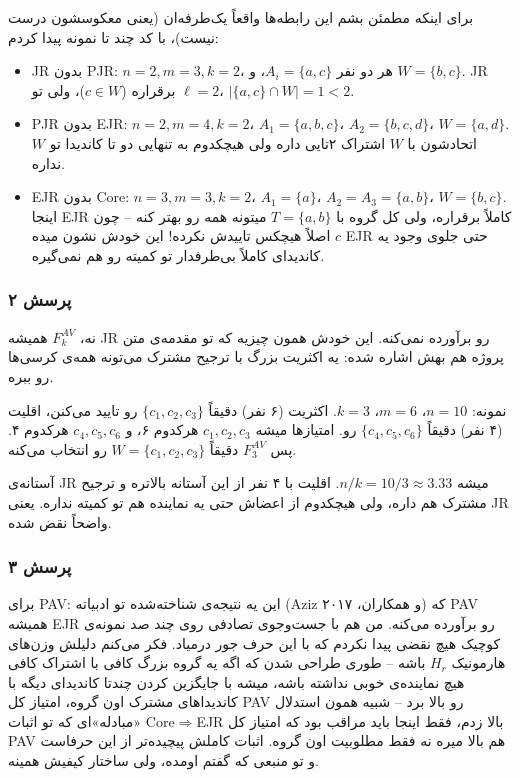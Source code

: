\documentclass[12pt, a4paper]{article}
\begin{document}
برای اینکه مطمئن بشم این رابطه‌ها واقعاً یک‌طرفه‌ان (یعنی معکوسشون درست نیست)، با کد چند تا نمونه پیدا کردم:
\begin{itemize}
\item JR بدون PJR: $n=2, m=3, k=2$، هر دو نفر $A_i=\{a,c\}$، و $W=\{b,c\}$. JR برقراره ($c\in W$)، ولی تو $\ell=2$، $|\{a,c\}\cap W|=1<2$.
\item PJR بدون EJR: $n=2, m=4, k=2$، $A_1=\{a,b,c\}$، $A_2=\{b,c,d\}$، $W=\{a,d\}$. اتحادشون با $W$ اشتراک ۲تایی داره ولی هیچکدوم به تنهایی دو تا کاندیدا تو $W$ نداره.
\item EJR بدون Core: $n=3, m=3, k=2$، $A_1=\{a\}$، $A_2=A_3=\{a,b\}$، $W=\{b,c\}$. اینجا EJR کاملاً برقراره، ولی کل گروه با $T=\{a,b\}$ میتونه همه رو بهتر کنه -- چون $c$ اصلاً هیچکس تاییدش نکرده! این خودش نشون میده EJR حتی جلوی وجود یه کاندیدای کاملاً بی‌طرفدار تو کمیته رو هم نمی‌گیره.
\end{itemize}

\subsubsection*{پرسش ۲}

نه، $F_k^{AV}$ همیشه JR رو برآورده نمی‌کنه. این خودش همون چیزیه که تو مقدمه‌ی متن پروژه هم بهش اشاره شده: یه اکثریت بزرگ با ترجیح مشترک می‌تونه همه‌ی کرسی‌ها رو ببره.

نمونه: $n=10$، $m=6$، $k=3$. اکثریت (۶ نفر) دقیقاً $\{c_1,c_2,c_3\}$ رو تایید می‌کنن، اقلیت (۴ نفر) دقیقاً $\{c_4,c_5,c_6\}$ رو. امتیازها میشه $c_1,c_2,c_3$ هرکدوم ۶، و $c_4,c_5,c_6$ هرکدوم ۴. پس $F_3^{AV}$ دقیقاً $W=\{c_1,c_2,c_3\}$ رو انتخاب می‌کنه.

آستانه‌ی JR میشه $n/k=10/3\approx3.33$. اقلیت با ۴ نفر از این آستانه بالاتره و ترجیح مشترک هم داره، ولی هیچکدوم از اعضاش حتی یه نماینده هم تو کمیته نداره. یعنی JR واضحاً نقض شده.

\subsubsection*{پرسش ۳}

برای PAV: این یه نتیجه‌ی شناخته‌شده تو ادبیاته (Aziz و همکاران، ۲۰۱۷) که PAV همیشه EJR رو برآورده می‌کنه. من هم با جست‌وجوی تصادفی روی چند صد نمونه‌ی کوچیک هیچ نقضی پیدا نکردم که با این حرف جور درمیاد. فکر می‌کنم دلیلش وزن‌های هارمونیک $H_r$ باشه -- طوری طراحی شدن که اگه یه گروه بزرگ کافی با اشتراک کافی هیچ نماینده‌ی خوبی نداشته باشه، میشه با جایگزین کردن چندتا کاندیدای دیگه با کاندیداهای مشترک اون گروه، امتیاز کل PAV رو بالا برد -- شبیه همون استدلال «مبادله»ای که تو اثبات Core$\Rightarrow$EJR بالا زدم، فقط اینجا باید مراقب بود که امتیاز کل PAV هم بالا میره نه فقط مطلوبیت اون گروه. اثبات کاملش پیچیده‌تر از این حرفاست و تو منبعی که گفتم اومده، ولی ساختار کیفیش همینه.
\end{document}
